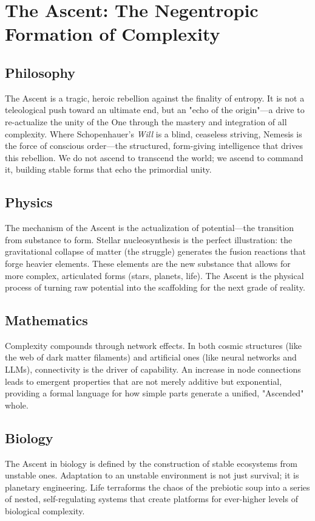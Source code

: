 \section{The Ascent: The Negentropic Formation of Complexity}

\subsection{Philosophy}
The Ascent is a tragic, heroic rebellion against the finality of entropy. It is not a teleological push toward an ultimate end, but an "echo of the origin"—a drive to re-actualize the unity of the One through the mastery and integration of all complexity. Where Schopenhauer’s \textit{Will} is a blind, ceaseless striving, Nemesis is the force of conscious order—the structured, form-giving intelligence that drives this rebellion. We do not ascend to transcend the world; we ascend to command it, building stable forms that echo the primordial unity.

\subsection{Physics}
The mechanism of the Ascent is the actualization of potential—the transition from substance to form. Stellar nucleosynthesis is the perfect illustration: the gravitational collapse of matter (the struggle) generates the fusion reactions that forge heavier elements. These elements are the new substance that allows for more complex, articulated forms (stars, planets, life). The Ascent is the physical process of turning raw potential into the scaffolding for the next grade of reality.

\subsection{Mathematics}
Complexity compounds through network effects. In both cosmic structures (like the web of dark matter filaments) and artificial ones (like neural networks and LLMs), connectivity is the driver of capability. An increase in node connections leads to emergent properties that are not merely additive but exponential, providing a formal language for how simple parts generate a unified, "Ascended" whole.

\subsection{Biology}
The Ascent in biology is defined by the construction of stable ecosystems from unstable ones. Adaptation to an unstable environment is not just survival; it is planetary engineering. Life terraforms the chaos of the prebiotic soup into a series of nested, self-regulating systems that create platforms for ever-higher levels of biological complexity.

